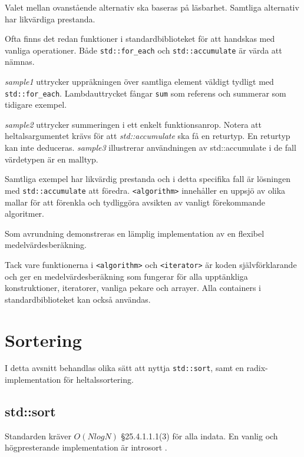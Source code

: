 \documentclass[a4paper,portrait]{miunart} %
\begin{document}
Valet mellan ovanstående alternativ ska baseras på läsbarhet. Samtliga 
alternativ har likvärdiga prestanda. 

Ofta finns det redan funktioner i standardbiblioteket för att handskas med 
vanliga operationer. Både \texttt{std::for\_each} och \texttt{std::accumulate} 
är värda att nämnas. 



\emph{sample1} uttrycker uppräkningen över samtliga element väldigt tydligt med 
\texttt{std::for\_each}. Lambdauttrycket fångar \texttt{sum} som referens och 
summerar som tidigare exempel. 

\emph{sample2} uttrycker summeringen i ett enkelt funktionsanrop. Notera att 
heltalsargumentet krävs för att \emph{std::accumulate} ska få en returtyp.  En 
returtyp kan inte deduceras.
\emph{sample3} illustrerar användningen av {std::accumulate} i de fall 
värdetypen är en malltyp. 

Samtliga exempel har likvärdig prestanda och i detta specifika fall är 
lösningen med \texttt{std::accumulate} att föredra. \texttt{<algorithm>} 
innehåller en uppsjö av olika mallar för att förenkla och tydliggöra avsikten 
av vanligt förekommande algoritmer.

\pagebreak[4]
Som avrundning demonstreras en lämplig implementation av en flexibel
medelvärdesberäkning.  


Tack vare funktionerna i \texttt{<algorithm>} och \texttt{<iterator>} är koden 
självförklarande och ger en medelvärdesberäkning som fungerar för alla 
upptänkliga konstruktioner, iteratorer, vanliga pekare och arrayer. Alla 
containers i standardbiblioteket kan också användas. 

\pagebreak
\section{Sortering}
\label{sec:sorting}
I detta avsnitt behandlas olika sätt att nyttja \texttt{std::sort}, samt en 
radix-implementation för heltalssortering. 
\subsection{std::sort}
\label{sec:std::sort}

Standarden kräver $O(NlogN)$ §25.4.1.1.1(3) \cite{ISO:n3337} för alla indata.
En vanlig och högpresterande implementation är introsort  \cite{intro-sort}.


\end{document}
